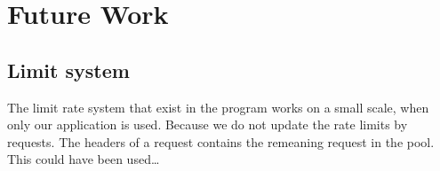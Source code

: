 \chapter{Future Work}\label{fwork}

\section{Limit system}
The limit rate system that exist in the program works on a small scale, when
only our application is used. Because we do not update the rate limits by
requests. The headers of a request contains the remeaning request in the pool.
This could have been used\ldots
